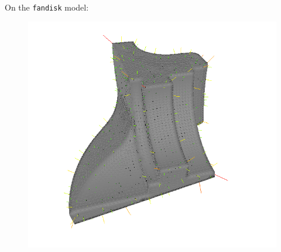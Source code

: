 \documentclass{beamer}
\begin{document}
\begin{frame}
    On the \texttt{fandisk} model:
    \begin{figure}
        \includegraphics[scale=0.18]{img/fandisk-normals}
    \end{figure}
\end{frame}
\end{document}

